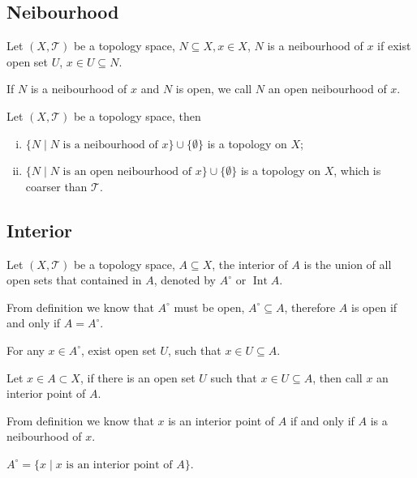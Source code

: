 \subsection{Neibourhood}
\begin{defi}
Let $(X, \mathcal{T})$ be a topology space,
$N \subseteq X, x \in X$, $N$ is a neibourhood of $x$ if
exist open set $U$, $x \in U \subseteq N$.
\end{defi}
If $N$ is a neibourhood of $x$ and $N$ is open, we call $N$ an open neibourhood of $x$.

\begin{pro}
Let $(X, \mathcal{T})$ be a topology space, then
\begin{enumerate}[i).]
\item $\{N \mid N\mbox{ is a neibourhood of }x\} \cup \{\emptyset\}$ is a topology on $X$;
\item $\{N \mid N\mbox{ is an open neibourhood of }x\} \cup \{\emptyset\}$ is a topology on $X$,
which is coarser than $\mathcal{T}$.
\end{enumerate}
\end{pro}


\subsection{Interior}
\begin{defi}
Let $(X, \mathcal{T})$ be a topology space, $A \subseteq X$,
the interior of $A$ is the union of all open sets that contained in $A$,
denoted by $A^\circ$ or $\mathop{\mathrm{Int}} A$.
\end{defi}
From definition we know that $A^\circ$ must be open,
$A^\circ \subseteq A$, therefore $A$ is open if and only if $A = A^\circ$.
\begin{pro}
For any $x \in A^\circ$, exist open set $U$,
such that $x \in U \subseteq A$.
\end{pro}
\begin{defi}
Let $x \in A \subset X$, if there is an open set $U$
such that $x \in U \subseteq A$, then call $x$ an interior point of $A$.
\end{defi}
From definition we know that $x$ is an interior point of $A$ if and only if $A$ is a neibourhood of $x$.
\begin{pro}
$A^\circ = \{x \mid x\mbox{ is an interior point of }A\}$.
\end{pro}


